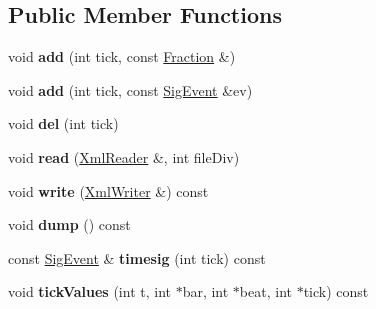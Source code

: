 \subsection*{Public Member Functions}
\begin{DoxyCompactItemize}
\item 
\mbox{\label{class_ms_1_1_time_sig_map_ab28a244540f71d1d6092610c1e31eb7c}} 
void {\bfseries add} (int tick, const \hyperlink{class_ms_1_1_fraction}{Fraction} \&)
\item 
\mbox{\label{class_ms_1_1_time_sig_map_a844cab1137a71f0b453acac4580c9ffe}} 
void {\bfseries add} (int tick, const \hyperlink{class_ms_1_1_sig_event}{Sig\+Event} \&ev)
\item 
\mbox{\label{class_ms_1_1_time_sig_map_a850ee5a9b794085024e68a0987018da8}} 
void {\bfseries del} (int tick)
\item 
\mbox{\label{class_ms_1_1_time_sig_map_a534cf6ca07ccbd19d10b847a4a20703d}} 
void {\bfseries read} (\hyperlink{class_ms_1_1_xml_reader}{Xml\+Reader} \&, int file\+Div)
\item 
\mbox{\label{class_ms_1_1_time_sig_map_ad77d806736b7a05d539e902281173b25}} 
void {\bfseries write} (\hyperlink{class_ms_1_1_xml_writer}{Xml\+Writer} \&) const
\item 
\mbox{\label{class_ms_1_1_time_sig_map_a4ac3bbf184ebd45a4d4f4a689168a712}} 
void {\bfseries dump} () const
\item 
\mbox{\label{class_ms_1_1_time_sig_map_a57a4a6113289c91eb38f49e610ceafc0}} 
const \hyperlink{class_ms_1_1_sig_event}{Sig\+Event} \& {\bfseries timesig} (int tick) const
\item 
\mbox{\label{class_ms_1_1_time_sig_map_a0ca55639ed2a836e4a80cc56cdb323ff}} 
void {\bfseries tick\+Values} (int t, int $\ast$bar, int $\ast$beat, int $\ast$tick) const
\item 
\mbox{\label{class_ms_1_1_time_sig_map_a4fdf03791075ae49f08e8563be67a4d4}} 

\end{DoxyCompactItemize}
